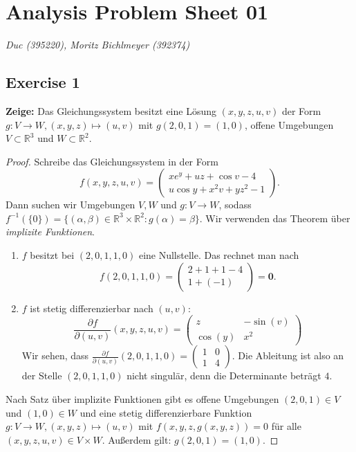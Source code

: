 \documentclass[a4paper]{article}
\begin{document}
\section*{Analysis Problem Sheet 01}
\textit{Duc (395220), Moritz Bichlmeyer (392374)}

\subsection*{Exercise 1}
\textbf{Zeige:} Das Gleichungssystem besitzt eine Lösung $(x,y,z,u,v)$ der Form $g: V \to W, (x,y,z) \mapsto (u,v)$ mit $g(2,0,1) = (1,0)$, offene Umgebungen $V \subset \mathbb R^3$ und $W \subset \mathbb R^2$.

\begin{proof}
Schreibe das Gleichungssystem in der Form
\[
	f(x,y,z,u,v) = \begin{pmatrix}
		xe^y +uz + \cos v - 4 \\
		u \cos y + x^2v + yz^2 - 1
	\end{pmatrix}.
\]
Dann suchen wir Umgebungen $V,W$ und $g: V \to W$, sodass $f^{-1}(\{ 0 \}) = \{ (\alpha, \beta) \in  \mathbb R^3 \times \mathbb R^2 : g(\alpha) = \beta \}$. Wir verwenden das Theorem über \emph{implizite Funktionen}.

\begin{enumerate}
\item $f$ besitzt bei $(2,0,1,1,0)$ eine Nullstelle. Das rechnet man nach
\[
	f(2,0,1,1,0) = \begin{pmatrix}
		2 + 1 + 1 - 4 \\
		1 + (-1)
	\end{pmatrix} = \mathbf 0.
\]

\item $f$ ist stetig differenzierbar nach $(u,v)$: 
\[
	\frac{\partial f}{\partial (u,v)} (x,y,z,u,v) = \begin{pmatrix}
	z & -\sin(v) \\
	\cos(y) & x^2
	\end{pmatrix}
\]
Wir sehen, dass $\frac{\partial f}{\partial (u,v)}(2,0,1,1,0) = \begin{pmatrix}
1 & 0 \\ 1 & 4
\end{pmatrix}$. Die Ableitung ist also an der Stelle $(2,0,1,1,0)$ nicht singulär, denn die Determinante beträgt $4$.
\end{enumerate}

Nach Satz über implizite Funktionen gibt es offene Umgebungen $(2,0,1) \in V$ und $(1,0) \in W$ und eine stetig differenzierbare Funktion $g: V \to W, (x,y,z) \mapsto (u,v)$ mit $f(x,y,z, g(x,y,z)) = 0$ für alle $(x,y,z,u,v) \in V \times W$. Außerdem gilt: $g(2,0,1) = (1,0)$.
\end{proof}
\end{document}
